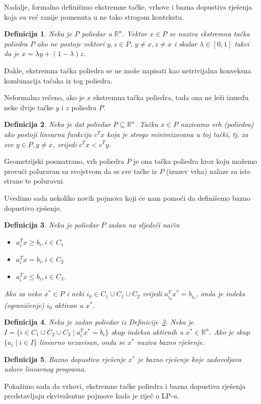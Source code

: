 \documentclass[a4paper, utf8, 11pt, colorlinks]{book}
\newtheorem{definition}{Definicija}[chapter]
\theoremstyle{definition}
\begin{document}
Nadalje, formalno definišimo ekstremne tačke, vrhove i bazna dopustiva rješenja koja su već ranije pomenuta u ne tako strogom kontekstu. 


\begin{definition}
   Neka je $P$ poliedar u $\mathbb{R}^n$.  Vektor $x \in P$ se naziva ekstremna tačka poliedra $P$
   ako ne postoje vektori $y, z \in P$, $y \neq x, z \neq x$ i skalar $\lambda \in [0, 1]$ takvi da je  $x = \lambda y + (1-\lambda)z$.
\end{definition}

Dakle, ekstremna tačka poliedra se ne može napisati kao netrivijalna konveksna kombinacija tačaka iz tog poliedra. 
 
  Neformalno rečeno, ako je  $x$ ekstremna tačka poliedra, tada ona ne leži između neke dvije tačke $y$ i $z$   poliedra $P$.
 
 
\begin{definition}\label{def:vrhPoliedra}
   Neka je dat poliedar $P \subseteq \mathbb{R}^n$. Tačku $x \in P$ nazivamo vrh (poliedra) ako postoji linearna funkcija  $c^T x$ koja je strogo minimizovana u toj tački, tj. za sve  $y\in P, y \neq x$, vrijedi $c^T x < c^T y$. 
\end{definition}
Geometrijski posmatrano,  vrh poliedra $P$ je ona tačka poliedra  kroz koju možemo provući poluravan sa svojstvom da se sve tačke iz $P$ (izuzev vrha) nalaze sa iste strane te poluravni.

Uvedimo sada nekoliko novih pojmova koji će nam pomoći da definišemo bazno dopustivo rješenje.

\begin{definition}\label{dfn:lp_aktivan}
   Neka je poliedar $P$ zadan na sljedeći način
   \begin{itemize}
       \item $a_i^T x \geq b_i, i \in C_1$
       \item $a_i^T x = b_i, i \in C_2 $
       \item $a_i^T x \leq b_i, i \in C_3 $. 
   \end{itemize}
   Ako za neko $x^* \in P$ i neki $i_0 \in C_1 \cup C_1 \cup C_2$ vrijedi 
   $a_{i_0}^T x^* = b_{i_0}$, onda je indeks (ograničenje) $i_0$ aktivan u $x^*$. 
\end{definition}

\begin{definition}
      Neka je zadan poliedar iz Definicije~\ref{dfn:lp_aktivan}. Neka je 
      $I = \{ i \in C_1 \cup C_2 \cup C_3 \mid a_i^T x^* = b_i \}$  skup indeksa aktivnih u $x^*\in \mathbb{R}^n$.  Ako je skup $\{ a_i \mid i \in I \}$ linearno nezavisan, onda se $x^*$  naziva bazno rješenje. 
\end{definition}
\begin{definition}
	 Bazno dopustivo rješenje $x^*$ je bazno rješenje koje zadovoljava  uslove linearnog programa. 
\end{definition}
Pokažimo sada da  vrhovi, ekstremne tačke poliedra i bazna dopustiva rješenja predstavljaju ekvivalentne pojmove kada je riječ o LP-u.
\end{document}

